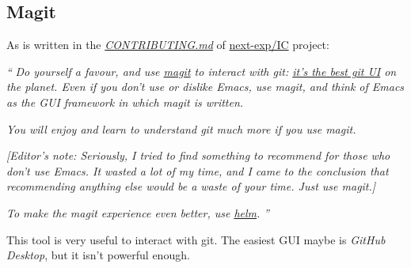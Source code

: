 \subsection{Magit}

As is written in the \href{https://github.com/next-exp/IC/blob/master/CONTRIBUTING.md#use-a-higher-level-git-interface}{\textit{CONTRIBUTING.md}} of \href{https://github.com/next-exp/IC}{\textsf{next-exp/IC}} project:

\vspace{8pt}

{\Large \textit{``}}
\textit{Do yourself a favour, and use \href{https://magit.vc/}{magit} to interact with git: \href{https://magit.vc/quotes/}{it's the best git UI} on the planet. Even if you don't use or dislike Emacs, use magit, and think of Emacs as the GUI framework in which magit is written.}

\textit{You will enjoy and learn to understand git much more if you use magit.}

\textit{[Editor's note: Seriously, I tried to find something to recommend for those who don't use Emacs. It wasted a lot of my time, and I came to the conclusion that recommending anything else would be a waste of your time. Just use magit.]}

\textit{To make the magit experience even better, use \href{https://emacs-helm.github.io/helm/}{helm}.}
{\Large \textit{''}}

\vspace{8pt}

This tool is very useful to interact with git. The easiest GUI maybe is \textit{GitHub Desktop}, but it isn't powerful enough.

